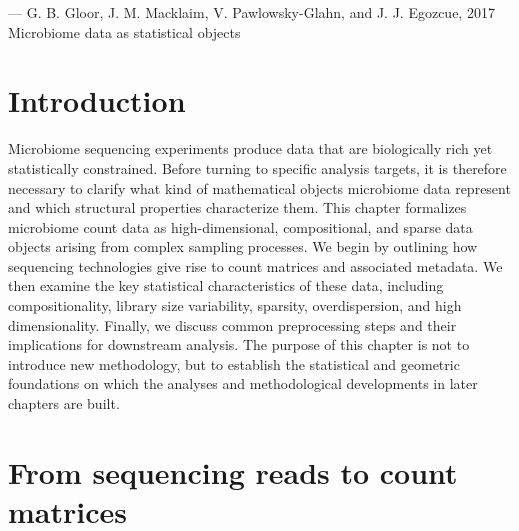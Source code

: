 
  {--- G. B. Gloor, J. M. Macklaim, V. Pawlowsky-Glahn, and J. J. Egozcue, 2017}
  {Microbiome data as statistical objects}
\nocite{gloor2017microbiome}
\chaptercontents

\section{Introduction}
\label{sec:2micro:introduction}

Microbiome sequencing experiments produce data that are biologically rich yet statistically constrained. Before turning to specific analysis targets, it is therefore necessary to clarify what kind of mathematical objects microbiome data represent and which structural properties characterize them. This chapter formalizes microbiome count data as high-dimensional, compositional, and sparse data objects arising from complex sampling processes. We begin by outlining how sequencing technologies give rise to count matrices and associated metadata. We then examine the key statistical characteristics of these data, including compositionality, library size variability, sparsity, overdispersion, and high dimensionality. Finally, we discuss common preprocessing steps and their implications for downstream analysis. The purpose of this chapter is not to introduce new methodology, but to establish the statistical and geometric foundations on which the analyses and methodological developments in later chapters are built.

\section{From sequencing reads to count matrices}
\label{micro:count_data}


